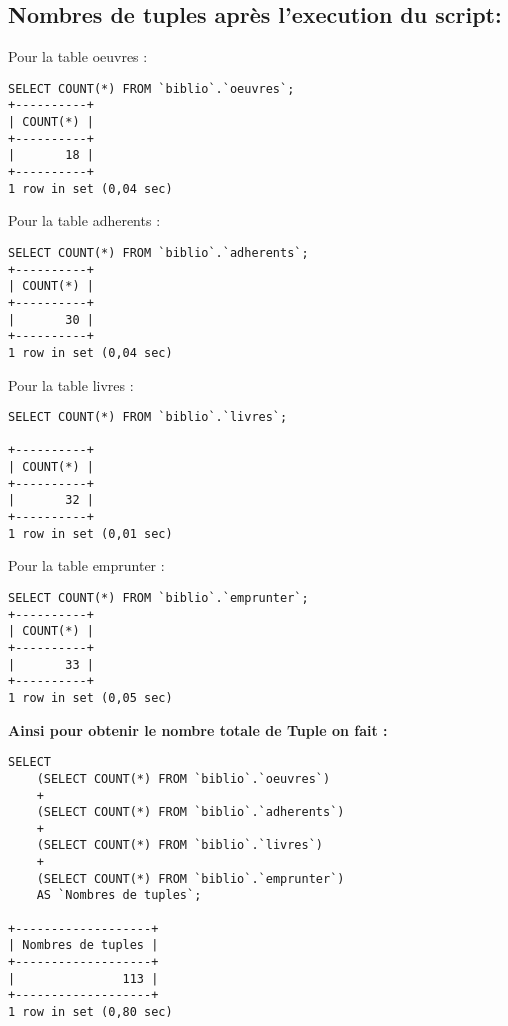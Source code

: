 \documentclass[11]{article}
\begin{document}
\subsection{Nombres de tuples après l'execution du script:}
Pour la table oeuvres :
\begin{verbatim}
SELECT COUNT(*) FROM `biblio`.`oeuvres`;
+----------+
| COUNT(*) |
+----------+
|       18 |
+----------+
1 row in set (0,04 sec)
\end{verbatim}
Pour la table adherents :
\begin{verbatim}
SELECT COUNT(*) FROM `biblio`.`adherents`;
+----------+
| COUNT(*) |
+----------+
|       30 |
+----------+
1 row in set (0,04 sec)
\end{verbatim}
Pour la table livres :
\begin{verbatim}
SELECT COUNT(*) FROM `biblio`.`livres`;

+----------+
| COUNT(*) |
+----------+
|       32 |
+----------+
1 row in set (0,01 sec)
\end{verbatim}

Pour la table emprunter :

\begin{verbatim}
SELECT COUNT(*) FROM `biblio`.`emprunter`;
+----------+
| COUNT(*) |
+----------+
|       33 |
+----------+
1 row in set (0,05 sec)	
\end{verbatim}

\textbf{Ainsi pour obtenir le nombre totale de Tuple on fait :}

\begin{verbatim}
SELECT 
	(SELECT COUNT(*) FROM `biblio`.`oeuvres`) 
	+
	(SELECT COUNT(*) FROM `biblio`.`adherents`)
	+
	(SELECT COUNT(*) FROM `biblio`.`livres`)
	+
	(SELECT COUNT(*) FROM `biblio`.`emprunter`)
	AS `Nombres de tuples`;

+-------------------+
| Nombres de tuples |
+-------------------+
|               113 |
+-------------------+
1 row in set (0,80 sec)
\end{verbatim}
\end{document}
